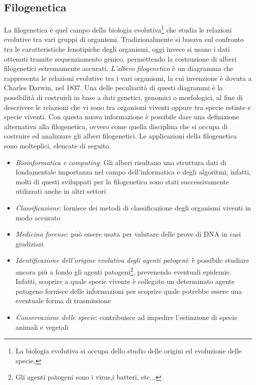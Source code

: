 \subsection{Filogenetica}
La filogenetica è quel campo della biologia evolutiva\footnote{La biologia evolutiva si occupa dello studio delle origini ed evoluzione delle specie.} che studia le relazioni evolutive tra vari gruppi di organismi.
Tradizionalmente si basava sul confronto tra le caratteristiche fenotipiche degli organismi, oggi invece si usano i dati ottenuti tramite sequenziamento genico, permettendo la costruzione di alberi filogenetici estremamente accurati.
\newline
\textit{L'albero filogenetico} è un diagramma che rappresenta le relazioni evolutive tra i vari organismi, la cui invenzione è dovuta a Charles Darwin, nel 1837. Una delle peculiarità di questi diagrammi è la possibilità di costruirli in base a dati genetici, genomici o morfologici, al fine di descrivere le relazioni che vi sono tra organismi viventi oppure tra specie estinte e specie viventi. Con questa nuova informazione è possibile dare una definizione alternativa alla filogenetica, ovvero come quella disciplina che si occupa di costruire ed analizzare gli alberi filogenetici.
\newline
Le applicazioni della filogenetica sono molteplici, elencate di seguito.
\begin{itemize}
	\item \textit{Bioinformatica e computing}: Gli alberi risultano una struttura dati di fondamentale importanza nel campo dell'informatica e degli algoritmi, infatti, molti di questi sviluppati per la filogenetica sono stati successivamente utilizzati anche in altri settori
	\item \textit{Classificazione}: fornisce dei metodi di classificazione degli organismi viventi in modo accurato
	\item \textit{Medicina forense}: può essere usata per valutare delle prove di DNA in casi giudiziari
	\item \textit{Identificazione dell'origine evolutiva degli agenti patogeni}: è possibile studiare ancora più a fondo gli agenti patogeni\footnote{Gli agenti patogeni sono i virus,i  batteri, etc...}, prevenendo eventuali epidemie. Infatti, scoprire a quale specie vivente è collegato un determinato agente patogeno fornisce delle informazioni per scoprire quale potrebbe essere una eventuale forma di trasmissione
	\item \textit{Conservazione delle specie}: contribuisce ad impedire l'estinzione di specie animali e vegetali
\end{itemize}

